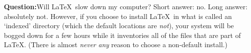 \newenvironment{question}[1]{\textbf{Question:}\qquad #1\quote}{\endquote}


\begin{question}{Will \LaTeX\ slow down my computer?}
  Short answer: no.
  Long answer: absolutely not.
  However, if you choose to install \LaTeX\ in what is called an `indexed' directory
  (which the default locations are \emph{not}),
  your system will be bogged down for a few hours while
  it inventories all of the files that are part of \LaTeX.
  (There is almost \emph{never \emph{any}} reason to choose a non-default install.)
\end{question}
